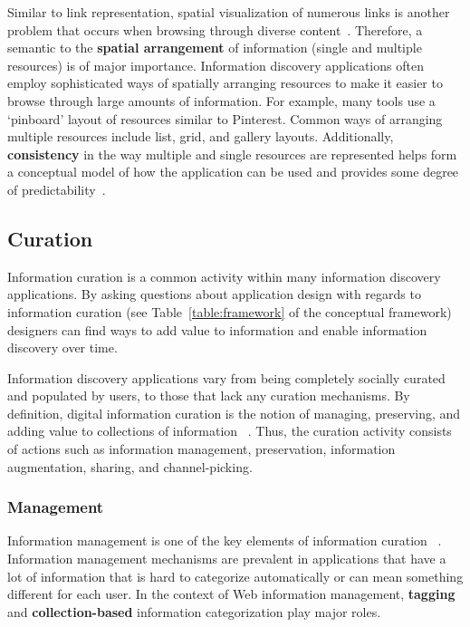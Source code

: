 \documentclass{sigchi}
\begin{document}
{{Similar to link representation, spatial visualization of numerous links is another problem that occurs when browsing through diverse content~\cite{abrams1998information}. Therefore, a semantic to the \textbf{spatial arrangement} of information (single and multiple resources) is of major importance. Information discovery applications often employ sophisticated ways of spatially arranging resources to make it easier to browse through large amounts of information. For example, many tools use a `pinboard' layout of resources similar to Pinterest. Common ways of arranging multiple resources include list, grid, and gallery layouts. Additionally, \textbf{consistency} in the way multiple and single resources are represented helps form a conceptual model of how the application can be used and provides some degree of predictability~\cite{norman2002design}.
} %

{\subsection{Curation}
Information curation is a common activity within many information discovery applications. By asking questions about application design with regards to information curation (see Table~\ref{table:framework} of the conceptual framework) designers can find ways to add value to information and enable information discovery over time.

Information discovery applications vary from being completely socially curated and populated by users, to those that lack any curation mechanisms. 
By definition, digital information curation is the notion of managing, preserving, and adding value to collections of information ~\cite{beagrie2008digital,whittaker2011personal}. Thus, the curation activity consists of actions such as information management, preservation, information augmentation, sharing, and channel-picking.

{\subsubsection{Management}
Information management is one of the key elements of information curation ~\cite{beagrie2008digital,whittaker2011personal}. Information management mechanisms are prevalent in applications that have a lot of information that is hard to categorize automatically or can mean something different for each user. In the context of Web information management, \textbf{tagging} and \textbf{collection-based} information categorization play major roles.

}}}
\end{document}
